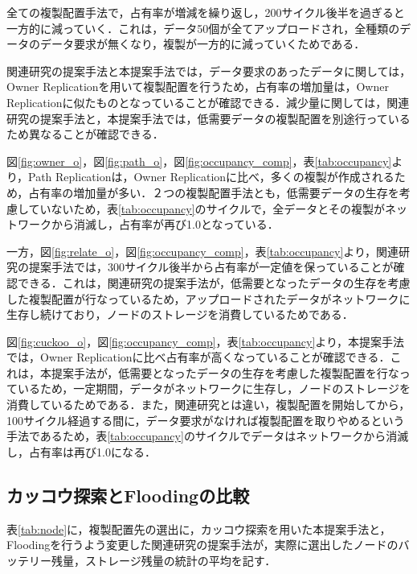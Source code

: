 \documentclass[11pt]{jreport}
\begin{document}
\newpage
\par 全ての複製配置手法で，占有率が増減を繰り返し，200サイクル後半を過ぎると一方的に減っていく．これは，データ50個が全てアップロードされ，全種類のデータのデータ要求が無くなり，複製が一方的に減っていくためである．
\par 関連研究の提案手法と本提案手法では，データ要求のあったデータに関しては，Owner Replicationを用いて複製配置を行うため，占有率の増加量は，Owner Replicationに似たものとなっていることが確認できる．減少量に関しては，関連研究の提案手法と，本提案手法では，低需要データの複製配置を別途行っているため異なることが確認できる．
\par 図\ref{fig:owner_o}，図\ref{fig:path_o}，図\ref{fig:occupancy_comp}，表\ref{tab:occupancy}より，Path Replicationは，Owner Replicationに比べ，多くの複製が作成されるため，占有率の増加量が多い．２つの複製配置手法とも，低需要データの生存を考慮していないため，表\ref{tab:occupancy}のサイクルで，全データとその複製がネットワークから消滅し，占有率が再び1.0となっている．
\par 一方，図\ref{fig:relate_o}，図\ref{fig:occupancy_comp}，表\ref{tab:occupancy}より，関連研究の提案手法では，300サイクル後半から占有率が一定値を保っていることが確認できる．これは，関連研究の提案手法が，低需要となったデータの生存を考慮した複製配置が行なっているため，アップロードされたデータがネットワークに生存し続けており，ノードのストレージを消費しているためである．
\par 図\ref{fig:cuckoo_o}，図\ref{fig:occupancy_comp}，表\ref{tab:occupancy}より，本提案手法では，Owner Replicationに比べ占有率が高くなっていることが確認できる．これは，本提案手法が，低需要となったデータの生存を考慮した複製配置を行なっているため，一定期間，データがネットワークに生存し，ノードのストレージを消費しているためである．また，関連研究とは違い，複製配置を開始してから，100サイクル経過する間に，データ要求がなければ複製配置を取りやめるという手法であるため，表\ref{tab:occupancy}のサイクルでデータはネットワークから消滅し，占有率は再び1.0になる．

\newpage
\newpage
\subsection{カッコウ探索とFloodingの比較}
表\ref{tab:node}に，複製配置先の選出に，カッコウ探索を用いた本提案手法と，Floodingを行うよう変更した関連研究の提案手法が，実際に選出したノードのバッテリー残量，ストレージ残量の統計の平均を記す．
\end{document}
